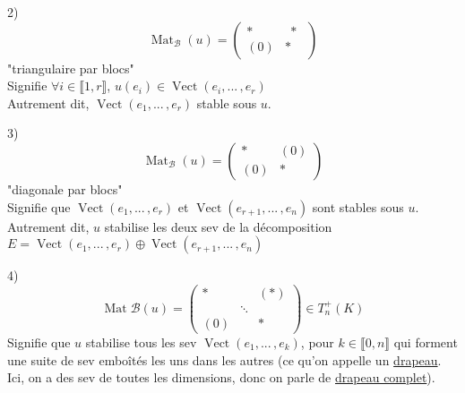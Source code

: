 \documentclass[10pt,a4paper]{article}
\theoremstyle{definition}
\DeclareMathOperator{\vect}{Vect}
\DeclareMathOperator{\Mat}{Mat}
\begin{document}
2) \[\Mat_\mathcal{B}(u) = \left(\begin{array}{c|c}
* & \:\:*\:\: \\
\hline
(0) & *
\end{array}\right)\]
"triangulaire par blocs" \\
Signifie $\forall i \in \llbracket 1, r \rrbracket$, $u(e_i) \in \vect(e_i, ...\, , e_r)$ \\
Autrement dit, $\vect(e_1, ...\, ,e_r)$ stable sous $u$.

\pagebreak

3) \[\Mat_\mathcal{B}(u) = \left(\begin{array}{c|c}
* & (0) \\
\hline
(0) & *
\end{array}\right)\]
"diagonale par blocs" \\
Signifie que $\vect(e_1, ...\, , e_r)$ et $\vect(e_{r + 1}, ...\, , e_n)$ sont stables sous $u$. \\
Autrement dit, $u$ stabilise les deux sev de la décomposition $E = \vect(e_1, ...\, , e_r) \oplus \vect(e_{r + 1}, ...\, , e_n)$

4) \[\Mat\mathcal{B}(u) = \begin{pmatrix}
* & & (*) \\
 & \ddots & \\
(0) & & *
\end{pmatrix} \in T_n^+(K)\]
Signifie que $u$ stabilise tous les sev $\vect(e_1, ...\, , e_k)$, pour $k \in \llbracket 0, n \rrbracket$ qui forment une suite de sev emboîtés les uns dans les autres (ce qu'on appelle un \uline{drapeau}. Ici, on a des sev de toutes les dimensions, donc on parle de \uline{drapeau complet}).
\end{document}
